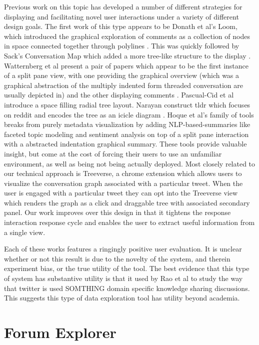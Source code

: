 \documentclass{egpubl}
\begin{document}
 Previous work on this topic has developed a number of different strategies for displaying and facilitating novel user interactions under a variety of different design goals. The first work of this type appears to be Donath et al's Loom, which introduced the graphical exploration of comments as a collection of nodes in space connected together through polylines \cite{donath1999visualizing}. This was quickly followed by Sack's Conversation Map which added a more tree-like structure to the display \cite{sack2000conversation}. Watternberg et al present a pair of papers which appear to be the first instance of a split pane view, with one providing the graphical overview (which was a graphical abstraction of the multiply indented form threaded conversation are usually depicted in) and the other displaying comments \cite{wattenberg2003conversation, dave2004flash}. Pascual-Cid et al introduce a space filling radial tree layout.  Narayan construct tldr which focuses on reddit and encodes the tree as an icicle diagram \cite{narayan2010not}.  Hoque et al's family of tools breaks from purely metadata visualization by adding NLP-based-summaries like faceted topic modeling and sentiment analysis on top of a split pane interaction with a abstracted indentation graphical summary\cite{hoque2014convis, hoque2016interactive}. These tools provide valuable insight, but come at the cost of forcing their users to use an unfamiliar environment, as well as being not being actually deployed. Most closely related to our technical approach is Treeverse, a chrome extension which allows users to visualize the conversation graph associated with a particular tweet.\cite{treeverse}  When the user is engaged with a particular tweet they can opt into the Treeverse view which renders the graph as a click and draggable tree with associated secondary panel. Our work improves over this design in that it tightens the response interaction response cycle and enables the user to extract useful information from a single view.

Each of these works features a ringingly positive user evaluation. It is unclear whether or not this result is due to the novelty of the system, and therein experiment bias, or the true utility of the tool. The best evidence that this type of system has substantive utility is that it used by Rao et al \cite{twittercanoes} to study the way that twitter is used SOMTHING domain specific knowledge sharing discussions. This suggests this type of data exploration tool has utility beyond academia.


\section{Forum Explorer}
\end{document}

